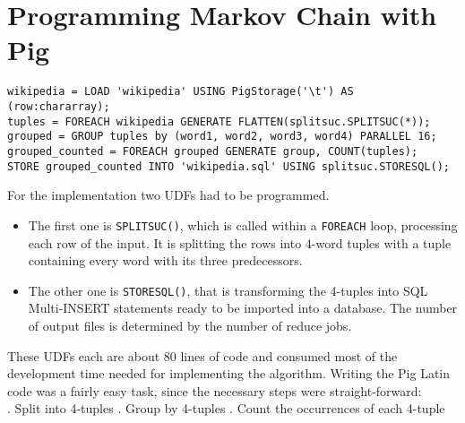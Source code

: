 \section{Programming Markov Chain with Pig}                                              
                         
\begin{lstlisting}[language=pig,caption=Markov Chain in Pig Latin,label=pigmarkovstructure,columns=fullflexible]    
wikipedia = LOAD 'wikipedia' USING PigStorage('\t') AS (row:chararray);
tuples = FOREACH wikipedia GENERATE FLATTEN(splitsuc.SPLITSUC(*));
grouped = GROUP tuples by (word1, word2, word3, word4) PARALLEL 16;
grouped_counted = FOREACH grouped GENERATE group, COUNT(tuples);
STORE grouped_counted INTO 'wikipedia.sql' USING splitsuc.STORESQL();
\end{lstlisting}                  

For the implementation two UDFs had to be programmed. 
\begin{itemize}
\item The first one is {\tt SPLITSUC()}, which is called within a {\tt FOREACH} loop, processing each row of the input. It is splitting the rows into 4-word tuples with a tuple containing every word with its three predecessors.
\item The other one is {\tt STORESQL()}, that is transforming the 4-tuples into SQL Multi-INSERT statements ready to be imported into a database. The number of output files is determined by the number of reduce jobs.
\end{itemize}

These UDFs each are about 80 lines of code and consumed most of the development time needed for implementing the algorithm. Writing the Pig Latin code was a fairly easy task, since the necessary steps were straight-forward: \\
{.} Split into 4-tuples {.} Group by 4-tuples {}. Count the occurrences of each 4-tuple



